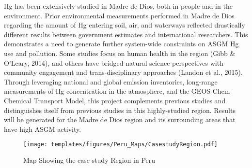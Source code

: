 \begin{flushleft}
Hg has been extensively studied in Madre de Dios, both in people and in the environment. Prior environmental measurements performed in Madre de Dios regarding the amount of Hg entering soil, air, and waterways reflected drastically different results between government estimates and international researchers. This demonstrates a need to generate further system-wide constraints on ASGM Hg use and pollution. Some studies focus on human health in the region (Gibb \& O'Leary, 2014), and others have bridged natural science perspectives with community engagement and trans-disciplinary approaches (Landon et al., 2015). Through leveraging national and global emission inventories, long-range measurements of Hg concentration in the atmosphere, and the GEOS-Chem Chemical Transport Model, this project complements previous studies and distinguishes itself from previous studies in this highly-studied region. Results will be generated for the Madre de Dios region and its surrounding areas that have high ASGM activity. 
\end{flushleft}
\begin{figure}[H]
  \texttt{[image: templates/figures/Peru\_Maps/CasestudyRegion.pdf]}
  \centering
  \caption{Map Showing the case study Region in Peru}
  \label{fig:PeruCS}
\end{figure}
\FloatBarrier

